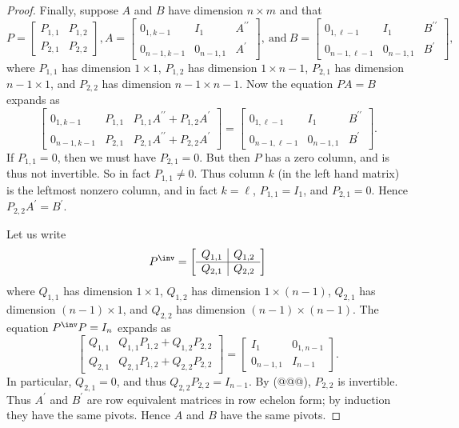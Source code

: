 \begin{proof}
Finally, suppose $A$ and $B$ have dimension $n \times m$ and that \[ P = \left[\begin{array}{c|c} P_{1,1} & P_{1,2} \\ \hline P_{2,1} & P_{2,2} \end{array}\right], A = \left[\begin{array}{c|c|c} 0_{1,k-1} & I_1 & A^{\prime\prime} \\ \hline 0_{n-1,k-1} & 0_{n-1,1} & A^\prime \end{array}\right],\ \mathrm{and}\ B = \left[\begin{array}{c|c|c} 0_{1,\ell-1} & I_1 & B^{\prime\prime} \\ \hline 0_{n-1,\ell-1} & 0_{n-1,1} & B^\prime \end{array}\right], \] where $P_{1,1}$ has dimension $1 \times 1$, $P_{1,2}$ has dimension $1 \times n-1$, $P_{2,1}$ has dimension $n-1 \times 1$, and $P_{2,2}$ has dimension $n-1 \times n-1$. Now the equation $PA = B$ expands as \[ \left[\begin{array}{c|c|c} 0_{1,k-1} & P_{1,1} & P_{1,1}A^{\prime\prime} + P_{1,2}A^\prime \\ \hline 0_{n-1,k-1} & P_{2,1} & P_{2,1}A^{\prime\prime} + P_{2,2}A^\prime \end{array}\right] = \left[\begin{array}{c|c|c} 0_{1,\ell-1} & I_1 & B^{\prime\prime} \\ \hline 0_{n-1,\ell-1} & 0_{n-1,1} & B^\prime \end{array}\right]. \] If $P_{1,1} = 0$, then we must have $P_{2,1} = 0$. But then $P$ has a zero column, and is thus not invertible. So in fact $P_{1,1} \neq 0$. Thus column $k$ (in the left hand matrix) is the leftmost nonzero column, and in fact $k = \ell$, $P_{1,1} = I_1$, and $P_{2,1} = 0$. Hence $P_{2,2}A^\prime = B^\prime$.

Let us write \[ P^\inv = \left[\begin{array}{c|c} Q_{1,1} & Q_{1,2} \\ \hline Q_{2,1} & Q_{2,2} \end{array}\right] \] where $Q_{1,1}$ has dimension $1 \times 1$, $Q_{1,2}$ has dimension $1 \times (n-1)$, $Q_{2,1}$ has dimension $(n-1) \times 1$, and $Q_{2,2}$ has dimension $(n-1) \times (n-1)$. The equation $P^\inv P = I_n$ expands as \[ \left[\begin{array}{c|c} Q_{1,1} & Q_{1,1}P_{1,2} + Q_{1,2}P_{2,2} \\ \hline Q_{2,1} & Q_{2,1}P_{1,2} + Q_{2,2}P_{2,2} \end{array}\right] = \left[\begin{array}{c|c} I_1 & 0_{1,n-1} \\ \hline 0_{n-1,1} & I_{n-1} \end{array}\right]. \] In particular, $Q_{2,1} = 0$, and thus $Q_{2,2}P_{2,2} = I_{n-1}$. By (@@@), $P_{2,2}$ is invertible. Thus $A^\prime$ and $B^\prime$ are row equivalent matrices in row echelon form; by induction they have the same pivots. Hence $A$ and $B$ have the same pivots.
\end{proof}

